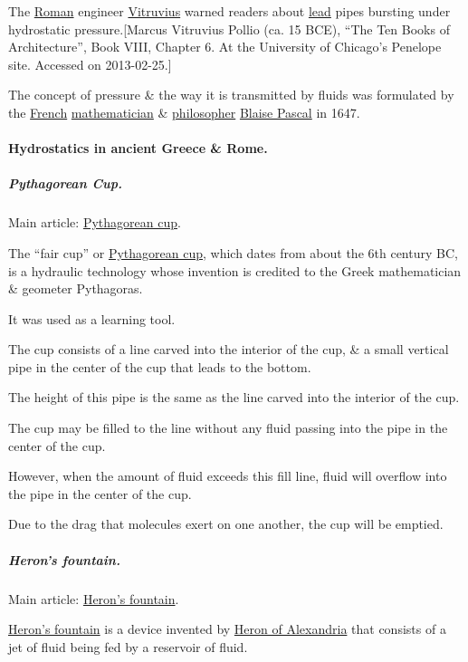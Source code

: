 \documentclass{article}
\begin{document}
The \href{https://en.wikipedia.org/wiki/Roman_Empire}{Roman} engineer \href{https://en.wikipedia.org/wiki/Vitruvius}{Vitruvius} warned readers about \href{https://en.wikipedia.org/wiki/Lead}{lead} pipes bursting under hydrostatic pressure.[Marcus Vitruvius Pollio (ca. 15 BCE), ``The Ten Books of Architecture'', Book VIII, Chapter 6. At the University of Chicago's Penelope site. Accessed on 2013-02-25.]

%
The concept of pressure \& the way it is transmitted by fluids was formulated by the \href{https://en.wikipedia.org/wiki/France}{French} \href{https://en.wikipedia.org/wiki/Mathematician}{mathematician} \& \href{https://en.wikipedia.org/wiki/Philosopher}{philosopher} \href{https://en.wikipedia.org/wiki/Blaise_Pascal}{Blaise Pascal} in 1647.

\paragraph{Hydrostatics in ancient Greece \& Rome.}

\subparagraph{Pythagorean Cup.} Main article: \href{https://en.wikipedia.org/wiki/Pythagorean_cup}{Pythagorean cup}.

%
The ``fair cup'' or \href{https://en.wikipedia.org/wiki/Pythagorean_cup}{Pythagorean cup}, which dates from about the 6th century BC, is a hydraulic technology whose invention is credited to the Greek mathematician \& geometer Pythagoras.

It was used as a learning tool.

%
The cup consists of a line carved into the interior of the cup, \& a small vertical pipe in the center of the cup that leads to the bottom.

The height of this pipe is the same as the line carved into the interior of the cup.

The cup may be filled to the line without any fluid passing into the pipe in the center of the cup.

However, when the amount of fluid exceeds this fill line, fluid will overflow into the pipe in the center of the cup.

Due to the drag that molecules exert on one another, the cup will be emptied.

\subparagraph{Heron's fountain.} Main article: \href{https://en.wikipedia.org/wiki/Heron's_fountain}{Heron's fountain}.

%
\href{https://en.wikipedia.org/wiki/Heron's_fountain}{Heron's fountain} is a device invented by \href{https://en.wikipedia.org/wiki/Heron_of_Alexandria}{Heron of Alexandria} that consists of a jet of fluid being fed by a reservoir of fluid.
\end{document}
